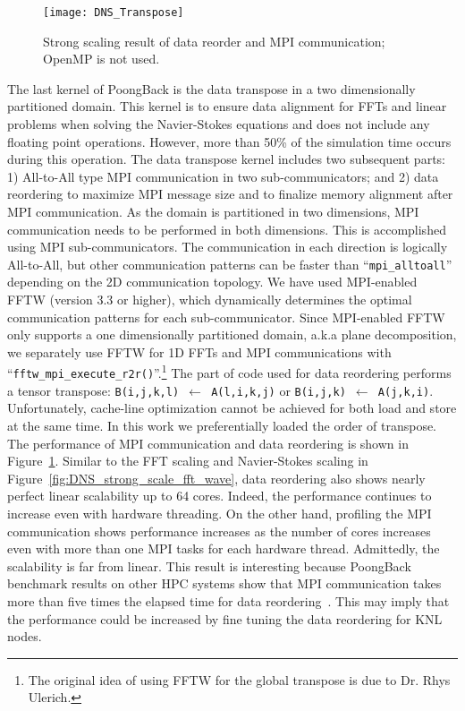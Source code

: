 \begin{figure}
 \begin{center}
   \texttt{[image: DNS\_Transpose]}
   \caption{Strong scaling result of data reorder and MPI communication; OpenMP is not used.}
   \label{fig:DNS_strong_scale_transpose}
 \end{center}
\end{figure}

The last kernel of PoongBack is the data transpose in a two
dimensionally partitioned domain. This kernel is to ensure data
alignment for FFTs and linear problems when solving the Navier-Stokes
equations and does not include any floating point operations. However,
more than 50\% of the simulation time occurs during this
operation. The data transpose kernel includes two subsequent parts: 1)
All-to-All type MPI communication in two sub-communicators; and 2)
data reordering to maximize MPI message size and to finalize memory
alignment after MPI communication. As the domain is partitioned in two
dimensions, MPI communication needs to be performed in both
dimensions. This is accomplished using MPI sub-communicators.  The
communication in each direction is logically All-to-All, but other
communication patterns can be faster than ``{\tt mpi\_alltoall}''
depending on the 2D communication topology. We have used MPI-enabled
FFTW (version 3.3 or higher), which dynamically determines the optimal
communication patterns for each sub-communicator. Since MPI-enabled
FFTW only supports a one dimensionally partitioned domain, a.k.a plane
decomposition, we separately use FFTW for 1D FFTs and MPI
communications with ``{\tt fftw\_mpi\_execute\_r2r()}''.\footnote{The
  original idea of using FFTW for the global transpose is due to
  Dr. Rhys Ulerich.} The part of code used for data reordering
performs a tensor transpose: {\tt B(i,j,k,l) $\leftarrow$ A(l,i,k,j)}
or {\tt B(i,j,k) $\leftarrow$ A(j,k,i)}. Unfortunately, cache-line
optimization cannot be achieved for both load and store at the same
time. In this work we preferentially loaded the order of transpose.
The performance of MPI communication and data reordering is shown in
Figure~\ref{fig:DNS_strong_scale_transpose}. Similar to the FFT
scaling and Navier-Stokes scaling in
Figure~\ref{fig:DNS_strong_scale_fft_wave}, data reordering also shows
nearly perfect linear scalability up to 64 cores. Indeed, the
performance continues to increase even with hardware threading.  On
the other hand, profiling the MPI communication shows performance
increases as the number of cores increases even with more than one MPI
tasks for each hardware thread. Admittedly, the scalability is far
from linear. This result is interesting because PoongBack benchmark
results on other HPC systems show that MPI communication takes more
than five times the elapsed time for data
reordering~\cite{Lee:2013kv}. This may imply that the performance
could be increased by fine tuning the data reordering for KNL nodes.

